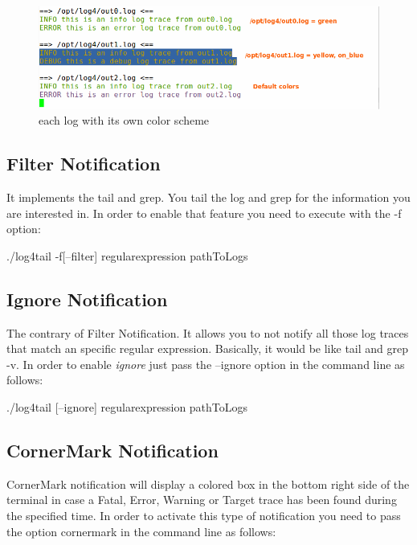 \begin{figure}[ht]
\centering
\includegraphics[scale=0.60]{multiple_colors.png}
\caption{\logftailer{} each log with its own color scheme}\label{fig:multiple_colors}
\end{figure}

\subsection{Filter Notification}
\label{sec:filter}
It implements the tail and grep. You tail the log 
and grep for the information you are interested in. In order to enable that 
feature you need to execute \logftailer{} with the -f option:

\begin{cmd}
  ./log4tail -f[--filter] regularexpression pathToLogs
\end{cmd}

\subsection{Ignore Notification} %
\label{sec:ignore}
The contrary of Filter Notification\label{sec:filter}. It allows you to not
notify all those log traces that match an specific regular expression.
Basically, it would be like tail and grep -v. In order to enable \emph{ignore}
just pass the --ignore option in the command line as follows:

\begin{cmd}
  ./log4tail [--ignore] regularexpression pathToLogs
\end{cmd}


\subsection{CornerMark Notification}
\label{sec:cornermark}
CornerMark notification will display a colored box in the bottom right side of
the terminal in case a Fatal, Error, Warning or Target trace has been found during the specified
time. In order to activate this type of notification you need to pass the
option cornermark in the command line as follows:

